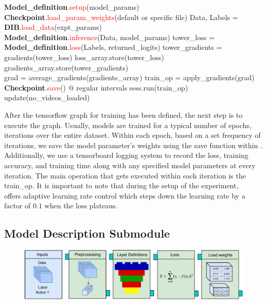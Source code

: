 \documentclass{llncs}
\begin{document}
\begin{algorithmic}[H]
\State \textbf{Model\_definition}.\textcolor{red}{setup}(model\_params)
\State \textbf{Checkpoint}.\textcolor{red}{load\_param\_weights}(default or specific file)
\State Data, Labels = \textbf{DIB}.\textcolor{red}{load\_data}(expt\_params)
\\
\State \textbf{Model\_definition}.\textcolor{red}{inference}(Data, model\_params)
\State tower\_loss = \textbf{Model\_definition}.\textcolor{red}{loss}(Labels, returned\_logits)
\State tower\_gradients = gradients(tower\_loss)
\State loss\_array.store(tower\_loss)
\State gradients\_array.store(tower\_gradients)
\EndFor
\\
\State grad = average\_gradients(gradients\_array)
\State train\_op = apply\_gradients(grad)
\\
\State \textbf{Checkpoint}.\textcolor{red}{save}() @ regular intervals
\State sess.run(train\_op)
\State update(no\_videos\_loaded)
\EndWhile
\EndProcedure
\end{algorithmic}

After the tensorflow graph for training has been defined, the next step is to execute the graph. 
Usually, models are trained for a typical number of epochs, iterations over the entire dataset.
Within each epoch, based on a set frequency of iterations, we save the model parameter's weights using the save function within \checkpoint.
Additionally, we use a tensorboard logging system to record the loss, training accuracy, and training time along with any specified model parameters at every iteration.
The main operation that gets executed within each iteration is the train\_op.
It is important to note that during the setup of the experiment, \acro~ offers adaptive learning rate control which steps down the learning rate by a factor of $0.1$ when the loss plateaus.



\subsection{Model Description Submodule}
\label{sec:modeldesc}
\begin{figure}[b!]
\centering
\includegraphics[width=\columnwidth]{images/model_submodule.pdf}
\caption{}
\label{fig:model_submodule}
\end{figure}
\end{document}
